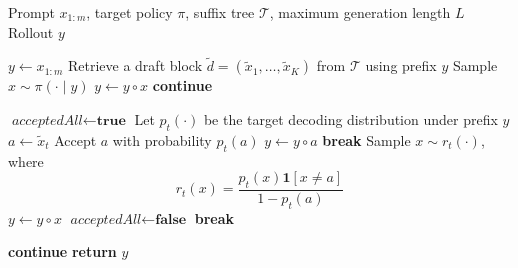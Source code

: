 \begin{algorithm}[t]
\caption{BubbleSpec Rollout with Deterministic Draft Verification}
\label{alg:bubblespec_rollout}
\small
\begin{algorithmic}[1]
\REQUIRE Prompt $x_{1:m}$, target policy $\pi$, suffix tree $\mathcal{T}$, maximum generation length $L$
\ENSURE Rollout $y$

\STATE $y \leftarrow x_{1:m}$
    \STATE Retrieve a draft block $\tilde{d} = (\tilde{x}_1,\dots,\tilde{x}_K)$ from $\mathcal{T}$ using prefix $y$
        \STATE Sample $x \sim \pi(\cdot \mid y)$
        \STATE $y \leftarrow y \circ x$
        \STATE \textbf{continue}
    \ENDIF

    \STATE $\textit{acceptedAll} \leftarrow \textbf{true}$
        \STATE Let $p_t(\cdot)$ be the target decoding distribution under prefix $y$
        \STATE $a \leftarrow \tilde{x}_t$
        \STATE Accept $a$ with probability $p_t(a)$
            \STATE $y \leftarrow y \circ a$
                \STATE \textbf{break}
            \ENDIF
        \ELSE
            \STATE Sample $x \sim r_t(\cdot)$, where
            \[
            r_t(x)=\frac{p_t(x)\mathbf{1}[x\neq a]}{1-p_t(a)}
            \]
            \STATE $y \leftarrow y \circ x$
            \STATE $\textit{acceptedAll} \leftarrow \textbf{false}$
            \STATE \textbf{break}
        \ENDIF
    \ENDFOR

        \STATE \textbf{continue} 
    \ENDIF
\ENDWHILE
\STATE \textbf{return} $y$
\end{algorithmic}
\end{algorithm}

